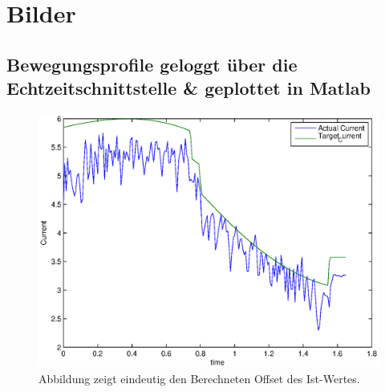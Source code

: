 \chapter{Bilder}
\label{bewegungsprofile_anhang}

\section{Bewegungsprofile geloggt über die Echtzeitschnittstelle \& geplottet in Matlab}
\label{sec:profile_polyscope_rci}

\begin{figure}[H]
  \centering
    \includegraphics[width=1\textwidth]{pic/joint1_polyscope_current.eps}
      \caption[Soll und Ist-Werte der Stromstärke wärend der Bewegung des 2.Gelenks mit Polyscope]{Abbildung zeigt eindeutig den Berechneten Offset des Ist-Wertes.}
      \label{fig:current_profile_joint1_rci}
\end{figure}


